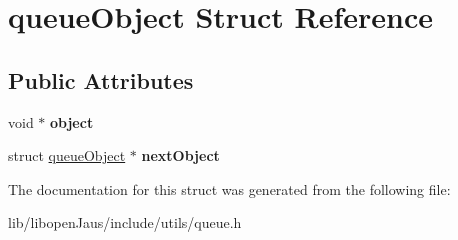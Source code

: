\hypertarget{structqueue_object}{\section{queue\-Object \-Struct \-Reference}
\label{structqueue_object}
}
\subsection*{\-Public \-Attributes}
\begin{DoxyCompactItemize}
\item 
\hypertarget{structqueue_object_a0e346ff5a5231e19390e22a1b414c911}{void $\ast$ {\bfseries object}}\label{structqueue_object_a0e346ff5a5231e19390e22a1b414c911}

\item 
\hypertarget{structqueue_object_a827d306087062c18a98e90ae024de228}{struct \hyperlink{structqueue_object}{queue\-Object} $\ast$ {\bfseries next\-Object}}\label{structqueue_object_a827d306087062c18a98e90ae024de228}

\end{DoxyCompactItemize}


\-The documentation for this struct was generated from the following file\-:\begin{DoxyCompactItemize}
\item 
lib/libopen\-Jaus/include/utils/queue.\-h\end{DoxyCompactItemize}
